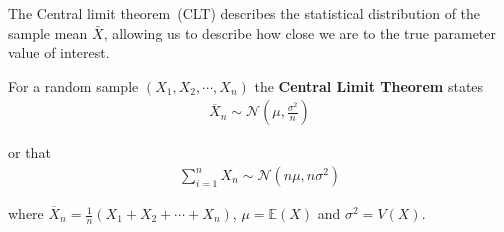 The Central limit theorem~(CLT) describes the statistical distribution of the sample mean $\bar{X}$, allowing us to describe how close we are to the true parameter value of interest. 

For a random sample $(X_{1},X_{2},\cdots,X_{n})$ the \textbf{Central Limit Theorem} states
\begin{align}
    \overline{X}_{n} \sim \mathcal{N}\left(\mu,\frac{\sigma^{2}}{n}\right)
\end{align}

or that 
\begin{align}
    \sum_{i=1}^{n} X_{n} \sim \mathcal{N}\left(n \mu, n \sigma^{2}\right)
\end{align}


where $\overline{X}_{n} =  \frac{1}{n}\left(X_{1}+X_{2}+\cdots+X_{n}\right)$, $\mu = \mathbb{E}(X)$ and $\sigma^{2} = V(X)$.

